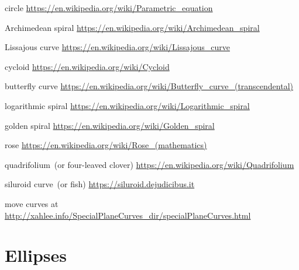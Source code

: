 \documentclass[a4paper,oneside,12pt]{article}
\begin{document}
{\color{red}
\begin{packeditem}
\item circle
  \url{https://en.wikipedia.org/wiki/Parametric_equation}

\item Archimedean spiral
  \url{https://en.wikipedia.org/wiki/Archimedean_spiral}

\item Lissajous curve
  \url{https://en.wikipedia.org/wiki/Lissajous_curve}

\item cycloid
  \url{https://en.wikipedia.org/wiki/Cycloid}

\item butterfly curve
  \url{https://en.wikipedia.org/wiki/Butterfly_curve_(transcendental)}

\item logarithmic spiral
  \url{https://en.wikipedia.org/wiki/Logarithmic_spiral}

\item golden spiral
  \url{https://en.wikipedia.org/wiki/Golden_spiral}

\item rose
  \url{https://en.wikipedia.org/wiki/Rose_(mathematics)}

\item quadrifolium~(or four-leaved clover)
  \url{https://en.wikipedia.org/wiki/Quadrifolium}

\item siluroid curve~(or fish)
  \url{https://siluroid.dejudicibus.it}

\item move curves at
  \url{http://xahlee.info/SpecialPlaneCurves_dir/specialPlaneCurves.html}
\end{packeditem}
}



\section{Ellipses}
\end{document}
